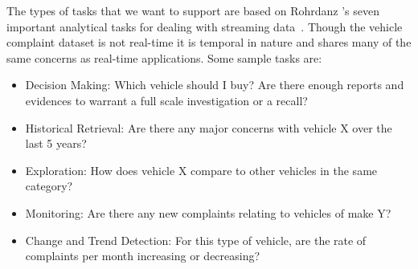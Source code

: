 The types of tasks that we want to support are based on Rohrdanz \etal's seven
important analytical tasks for dealing with streaming data~\cite{ROH2011a}. 
Though the vehicle complaint dataset is not real-time it is temporal in nature
and shares many of the same concerns as real-time applications. Some sample 
tasks are:

\begin{itemize}[noitemsep]
   \item Decision Making: Which vehicle should I buy? Are there enough
   reports and evidences to warrant a full scale investigation or a recall?
   \item Historical Retrieval: Are there any major concerns with vehicle X over the last 5 years?
   \item Exploration: How does vehicle X compare to other vehicles in the same category?
   \item Monitoring: Are there any new complaints relating to vehicles of make Y?
   \item Change and Trend Detection: For this type of vehicle, are the rate of complaints per month increasing or decreasing?
\end{itemize}


